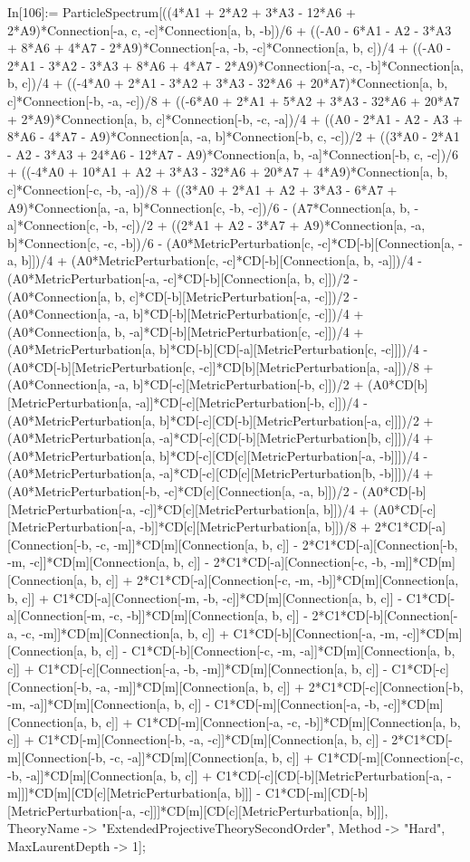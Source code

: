 In[106]:= ParticleSpectrum[((4*A1 + 2*A2 + 3*A3 - 12*A6 + 2*A9)*Connection[-a, c, -c]*Connection[a, b, -b])/6 + ((-A0 - 6*A1 - A2 - 3*A3 + 8*A6 + 4*A7 - 2*A9)*Connection[-a, -b, -c]*Connection[a, b, c])/4 + ((-A0 - 2*A1 - 3*A2 - 3*A3 + 8*A6 + 4*A7 - 2*A9)*Connection[-a, -c, -b]*Connection[a, b, c])/4 + ((-4*A0 + 2*A1 - 3*A2 + 3*A3 - 32*A6 + 20*A7)*Connection[a, b, c]*Connection[-b, -a, -c])/8 + ((-6*A0 + 2*A1 + 5*A2 + 3*A3 - 32*A6 + 20*A7 + 2*A9)*Connection[a, b, c]*Connection[-b, -c, -a])/4 + ((A0 - 2*A1 - A2 - A3 + 8*A6 - 4*A7 - A9)*Connection[a, -a, b]*Connection[-b, c, -c])/2 + ((3*A0 - 2*A1 - A2 - 3*A3 + 24*A6 - 12*A7 - A9)*Connection[a, b, -a]*Connection[-b, c, -c])/6 + ((-4*A0 + 10*A1 + A2 + 3*A3 - 32*A6 + 20*A7 + 4*A9)*Connection[a, b, c]*Connection[-c, -b, -a])/8 + ((3*A0 + 2*A1 + A2 + 3*A3 - 6*A7 + A9)*Connection[a, -a, b]*Connection[c, -b, -c])/6 - (A7*Connection[a, b, -a]*Connection[c, -b, -c])/2 + ((2*A1 + A2 - 3*A7 + A9)*Connection[a, -a, b]*Connection[c, -c, -b])/6 - (A0*MetricPerturbation[c, -c]*CD[-b][Connection[a, -a, b]])/4 + (A0*MetricPerturbation[c, -c]*CD[-b][Connection[a, b, -a]])/4 - (A0*MetricPerturbation[-a, -c]*CD[-b][Connection[a, b, c]])/2 - (A0*Connection[a, b, c]*CD[-b][MetricPerturbation[-a, -c]])/2 - (A0*Connection[a, -a, b]*CD[-b][MetricPerturbation[c, -c]])/4 + (A0*Connection[a, b, -a]*CD[-b][MetricPerturbation[c, -c]])/4 + (A0*MetricPerturbation[a, b]*CD[-b][CD[-a][MetricPerturbation[c, -c]]])/4 - (A0*CD[-b][MetricPerturbation[c, -c]]*CD[b][MetricPerturbation[a, -a]])/8 + (A0*Connection[a, -a, b]*CD[-c][MetricPerturbation[-b, c]])/2 + (A0*CD[b][MetricPerturbation[a, -a]]*CD[-c][MetricPerturbation[-b, c]])/4 - (A0*MetricPerturbation[a, b]*CD[-c][CD[-b][MetricPerturbation[-a, c]]])/2 + (A0*MetricPerturbation[a, -a]*CD[-c][CD[-b][MetricPerturbation[b, c]]])/4 + (A0*MetricPerturbation[a, b]*CD[-c][CD[c][MetricPerturbation[-a, -b]]])/4 - (A0*MetricPerturbation[a, -a]*CD[-c][CD[c][MetricPerturbation[b, -b]]])/4 + (A0*MetricPerturbation[-b, -c]*CD[c][Connection[a, -a, b]])/2 - (A0*CD[-b][MetricPerturbation[-a, -c]]*CD[c][MetricPerturbation[a, b]])/4 + (A0*CD[-c][MetricPerturbation[-a, -b]]*CD[c][MetricPerturbation[a, b]])/8 + 2*C1*CD[-a][Connection[-b, -c, -m]]*CD[m][Connection[a, b, c]] - 2*C1*CD[-a][Connection[-b, -m, -c]]*CD[m][Connection[a, b, c]] - 2*C1*CD[-a][Connection[-c, -b, -m]]*CD[m][Connection[a, b, c]] + 2*C1*CD[-a][Connection[-c, -m, -b]]*CD[m][Connection[a, b, c]] + C1*CD[-a][Connection[-m, -b, -c]]*CD[m][Connection[a, b, c]] - C1*CD[-a][Connection[-m, -c, -b]]*CD[m][Connection[a, b, c]] - 2*C1*CD[-b][Connection[-a, -c, -m]]*CD[m][Connection[a, b, c]] + C1*CD[-b][Connection[-a, -m, -c]]*CD[m][Connection[a, b, c]] - C1*CD[-b][Connection[-c, -m, -a]]*CD[m][Connection[a, b, c]] + C1*CD[-c][Connection[-a, -b, -m]]*CD[m][Connection[a, b, c]] - C1*CD[-c][Connection[-b, -a, -m]]*CD[m][Connection[a, b, c]] + 2*C1*CD[-c][Connection[-b, -m, -a]]*CD[m][Connection[a, b, c]] - C1*CD[-m][Connection[-a, -b, -c]]*CD[m][Connection[a, b, c]] + C1*CD[-m][Connection[-a, -c, -b]]*CD[m][Connection[a, b, c]] + C1*CD[-m][Connection[-b, -a, -c]]*CD[m][Connection[a, b, c]] - 2*C1*CD[-m][Connection[-b, -c, -a]]*CD[m][Connection[a, b, c]] + C1*CD[-m][Connection[-c, -b, -a]]*CD[m][Connection[a, b, c]] + C1*CD[-c][CD[-b][MetricPerturbation[-a, -m]]]*CD[m][CD[c][MetricPerturbation[a, b]]] - C1*CD[-m][CD[-b][MetricPerturbation[-a, -c]]]*CD[m][CD[c][MetricPerturbation[a, b]]], TheoryName -> "ExtendedProjectiveTheorySecondOrder", Method -> "Hard", MaxLaurentDepth -> 1]; 